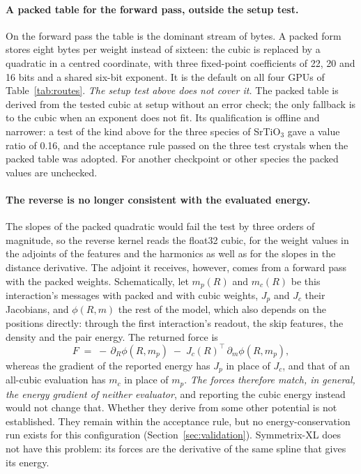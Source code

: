 \documentclass[11pt]{article}
\begin{document}
\paragraph{A packed table for the forward pass, outside the setup test.}
On the forward pass the table is the dominant stream of bytes. A packed form stores eight bytes per weight
instead of sixteen: the cubic is replaced by a quadratic in a centred coordinate, with three fixed-point
coefficients of 22, 20 and 16 bits and a shared six-bit exponent. It is the default on all four GPUs of
Table~\ref{tab:routes}. \emph{The setup test above does not cover it.} The packed table is derived from the
tested cubic at setup without an error check; the only fallback is to the cubic when an exponent does not fit.
Its qualification is offline and narrower: a test of the kind above for the three species of SrTiO$_3$ gave a
value ratio of 0.16, and the acceptance rule passed on the three test crystals when the packed table was
adopted. For another checkpoint or other species the packed values are unchecked.

\paragraph{The reverse is no longer consistent with the evaluated energy.}
The slopes of the packed quadratic would fail the test by three orders of magnitude, so the reverse kernel reads
the float32 cubic, for the weight values in the adjoints of the features and the harmonics as well as for the
slopes in the distance derivative. The adjoint it receives, however, comes from a forward pass with the packed
weights. Schematically, let $m_p(R)$ and $m_c(R)$ be this interaction's messages with packed and with cubic
weights, $J_p$ and $J_c$ their Jacobians, and $\phi(R,m)$ the rest of the model, which also depends on the
positions directly: through the first interaction's readout, the skip features, the density and the pair
energy. The returned force is
\begin{equation}
F \;=\; -\,\partial_R\phi(R,m_p) \;-\; J_c(R)^{\top}\,\partial_m\phi(R,m_p),
\end{equation}
whereas the gradient of the reported energy has $J_p$ in place of $J_c$, and that of an all-cubic evaluation
has $m_c$ in place of $m_p$. \emph{The forces therefore match, in general, the energy gradient of neither
evaluator}, and reporting the cubic energy instead would not change that. Whether they derive from some other
potential is not established. They remain within the acceptance rule,
but no energy-conservation run exists for this configuration (Section~\ref{sec:validation}). Symmetrix-XL does
not have this problem: its forces are the derivative of the same spline that gives its energy.
\end{document}
